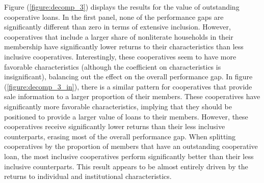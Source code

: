 \documentclass[11pt]{article}
\begin{document}
\begin{figure}[H]
\begin{subfigure}[t]{0.475\textwidth}
    \end{subfigure}
\end{figure}

Figure (\ref{figure:decomp_3}) displays the results for the value of outstanding cooperative loans. In the first panel, none of the performance gaps are significantly different than zero in terms of extensive inclusion. However, cooperatives that include a larger share of nonliterate households in their membership have significantly lower returns to their characteristics than less inclusive cooperatives. Interestingly, these cooperatives seem to have more favorable characteristics (although the coefficient on characteristics is insignificant), balancing out the effect on the overall performance gap. In figure (\ref{figure:decomp_3_in}), there is a similar pattern for cooperatives that provide sale information to a larger proportion of their members. These cooperatives have significantly more favorable characteristics, implying that they should be positioned to provide a larger value of loans to their members. However, these cooperatives receive significantly lower returns than their less inclusive counterparts, erasing most of the overall performance gap. When splitting cooperatives by the proportion of members that have an outstanding cooperative loan, the most inclusive cooperatives perform significantly better than their less inclusive counterparts. This result appears to be almost entirely driven by the returns to individual and institutional characteristics. 
\end{document}
